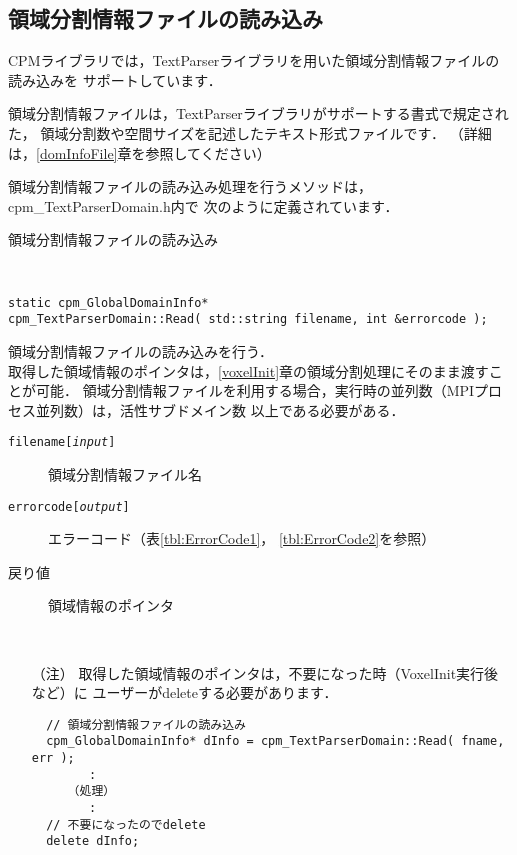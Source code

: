 \clearpage


\subsection{領域分割情報ファイルの読み込み}
CPMライブラリでは，TextParserライブラリを用いた領域分割情報ファイルの読み込みを
サポートしています．

領域分割情報ファイルは，TextParserライブラリがサポートする書式で規定された，
領域分割数や空間サイズを記述したテキスト形式ファイルです．
（詳細は，\ref{domInfoFile}章を参照してください）

領域分割情報ファイルの読み込み処理を行うメソッドは，cpm\_TextParserDomain.h内で
次のように定義されています．\\

\begin{spacing}{0.8}
\begin{itembox}[l]{領域分割情報ファイルの読み込み}
{\tt
\begin{verbatim}
static cpm_GlobalDomainInfo*
cpm_TextParserDomain::Read( std::string filename, int &errorcode );
\end{verbatim}
}
領域分割情報ファイルの読み込みを行う．\\
取得した領域情報のポインタは，\ref{voxelInit}章の領域分割処理にそのまま渡すことが可能．
領域分割情報ファイルを利用する場合，実行時の並列数（MPIプロセス並列数）は，活性サブドメイン数
以上である必要がある．

\begin{description}
\item[{\tt filename[{\it input}]}] 領域分割情報ファイル名
\item[{\tt errorcode[{\it output}]}] エラーコード（表\ref{tbl:ErrorCode1}，
\ref{tbl:ErrorCode2}を参照）
\\
\item[戻り値] 領域情報のポインタ
\end{description}
\end{itembox}\\
\end{spacing}

\begin{itemize}
\item[（注）] 取得した領域情報のポインタは，不要になった時（VoxelInit実行後など）に
ユーザーがdeleteする必要があります．
\begin{verbatim}
  // 領域分割情報ファイルの読み込み
  cpm_GlobalDomainInfo* dInfo = cpm_TextParserDomain::Read( fname, err );
        :
     （処理）
        :
  // 不要になったのでdelete
  delete dInfo;
\end{verbatim}
\end{itemize}


